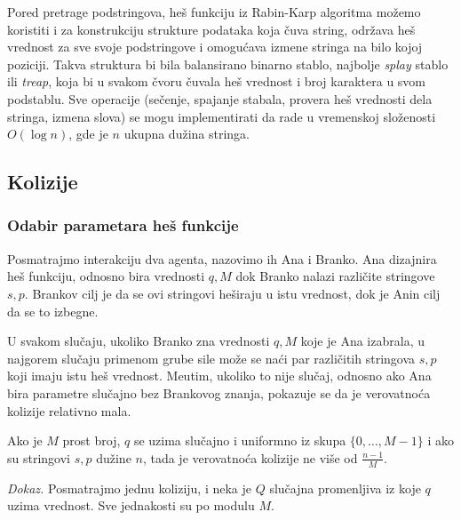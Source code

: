 \noindent
\begin{minipage}[l]{\textwidth}

\end{minipage}

Pored pretrage podstringova, he\v s funkciju iz Rabin-Karp algoritma mo\v zemo koristiti i za konstrukciju strukture podataka koja \v cuva string, odr\v zava he\v s vrednost za sve svoje podstringove i omogu\' cava izmene stringa na bilo kojoj poziciji. Takva struktura bi bila balansirano binarno stablo, najbolje \textit{splay} stablo\cite{splayrad} ili \textit{treap}\cite{treaprad}, koja bi u svakom \v cvoru \v cuvala he\v s vrednost i broj karaktera u svom podstablu. Sve operacije (se\v cenje, spajanje stabala, provera he\v s vrednosti dela stringa, izmena slova) se mogu implementirati da rade u vremenskoj slo\v zenosti $O(\log n)$, gde je $n$ ukupna du\v zina stringa. 

\subsection{Kolizije}

\subsubsection{Odabir parametara he\v s funkcije}

Posmatrajmo interakciju dva agenta, nazovimo ih Ana i Branko. Ana dizajnira he\v s funkciju, odnosno bira vrednosti $q, M$ dok Branko nalazi razli\v cite stringove $s,p$. Brankov cilj je da se ovi stringovi he\v siraju u istu vrednost, dok je Anin cilj da se to izbegne.

U svakom slu\v caju, ukoliko Branko zna vrednosti $q,M$ koje je Ana izabrala, u najgorem slu\v caju primenom grube sile mo\v ze se na\' ci par razli\v citih stringova $s,p$ koji imaju istu he\v s vrednost. Me\dj utim, ukoliko to nije slu\v caj, odnosno ako Ana bira parametre slu\v cajno bez Brankovog znanja, pokazuje se da je verovatno\' ca kolizije relativno mala.

\begin{thm}
    Ako je $M$ prost broj, $q$ se uzima slu\v cajno i uniformno iz skupa $\{0, \ldots, M-1\}$ i ako su stringovi $s,p$ du\v zine $n$, tada je verovatno\' ca kolizije ne vi\v se od $\frac{n-1}{M}$.
\end{thm}

\textit{Dokaz.} Posmatrajmo jednu koliziju, i neka je $Q$ slu\v cajna promenljiva iz koje $q$ uzima vrednost. Sve jednakosti su po modulu $M$.

